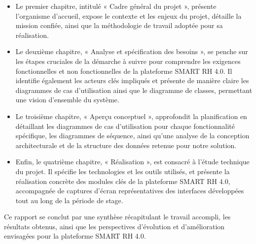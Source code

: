 \begin{itemize}
    \item Le premier chapitre, intitulé « Cadre général du projet », présente l'organisme d'accueil, expose le contexte et les enjeux du projet, détaille la mission confiée, ainsi que la méthodologie de travail adoptée pour sa réalisation.
    
    \item Le deuxième chapitre, « Analyse et spécification des besoins », se penche sur les étapes cruciales de la démarche à suivre pour comprendre les exigences fonctionnelles et non fonctionnelles de la plateforme SMART RH 4.0. Il identifie également les acteurs clés impliqués et présente de manière claire les diagrammes de cas d'utilisation ainsi que le diagramme de classes, permettant une vision d'ensemble du système.
    
    \item Le troisième chapitre, « Aperçu conceptuel », approfondit la planification en détaillant les diagrammes de cas d'utilisation pour chaque fonctionnalité spécifique, les diagrammes de séquence, ainsi qu'une analyse de la conception architecturale et de la structure des données retenue pour notre solution.
    
    \item Enfin, le quatrième chapitre, « Réalisation », est consacré à l'étude technique du projet. Il spécifie les technologies et les outils utilisés, et présente la réalisation concrète des modules clés de la plateforme SMART RH 4.0, accompagnée de captures d'écran représentatives des interfaces développées tout au long de la période de stage.
\end{itemize}

Ce rapport se conclut par une synthèse récapitulant le travail accompli, les résultats obtenus, ainsi que les perspectives d'évolution et d'amélioration envisagées pour la plateforme SMART RH 4.0.
